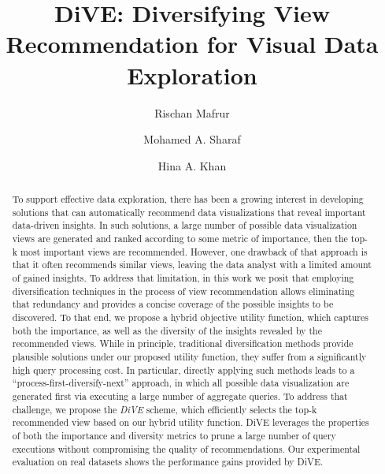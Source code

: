 \documentclass[sigconf]{acmart}
\begin{document}
\title{DiVE: Diversifying View Recommendation for Visual Data Exploration}


\author{Rischan Mafrur}

\author{Mohamed A. Sharaf}

\author{Hina A. Khan}


\newcommand{\quotes}[1]{``#1''}

\begin{abstract}

To support effective data exploration, there has been a growing interest in developing solutions that can automatically recommend data visualizations that reveal important data-driven insights.
In such solutions, a large number of possible data visualization views are generated and ranked according to some metric of importance, then the top-k most important views are recommended. 
However, one drawback of that approach is that it often recommends similar views, leaving the data analyst with a limited amount of gained insights.    
To address that limitation, in this work we posit that employing diversification techniques in the process of view recommendation allows eliminating that redundancy and provides a concise coverage of the possible insights to be discovered.
To that end, we propose a hybrid objective utility function, which captures both the importance, as well as the diversity of the insights revealed by the recommended views.
While in principle, traditional diversification methods  provide plausible solutions under our proposed utility function, they suffer from a significantly high query processing cost. 
%
In particular, directly applying such methods leads to a ``process-first-diversify-next'' approach, in which all possible data visualization are generated first via executing a large number of aggregate queries. 
%
To address that challenge, we propose the {\em DiVE} scheme, which efficiently selects the top-k recommended view based on our hybrid utility function.
%
DiVE leverages the properties of both the importance and diversity metrics to prune a large number of query executions without compromising the quality of recommendations.
%
Our experimental evaluation on real datasets shows the performance gains provided by DiVE.


\end{abstract}
\end{document}
